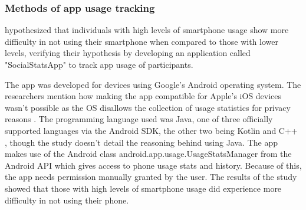 \documentclass[12pt]{article}
\begin{document}
\subsubsection{Methods of app usage tracking} %

\textcite{RefWorks:RefID:118-rosa2022problematic} hypothesized that individuals with high levels of 
smartphone usage show more difficulty in not using their smartphone when compared to those with lower levels, verifying their 
hypothesis by developing an application called "SocialStatsApp" to track app usage of participants.

The app was developed for devices using Google's Android operating system. The researchers
mention how making the app compatible for Apple's iOS devices wasn't possible as the OS
disallows the collection of usage statistics for privacy reasons \autocite{applesupport-ifanappasks}. 
The programming language used was Java, one of three officially supported languages via the Android SDK, 
the other two being Kotlin and C++ \autocite{androiddevelopment-appfundamentals}, though the study doesn't detail the 
reasoning behind using Java. The app makes use of the Android class 
\newline android.app.usage.UsageStatsManager from the 
Android API which gives access to phone usage stats and history. Because of this, the app needs permission 
manually granted by the user. The results of the study showed that those with high levels of smartphone usage 
did experience more difficulty in not using their phone. \newline
\end{document}

